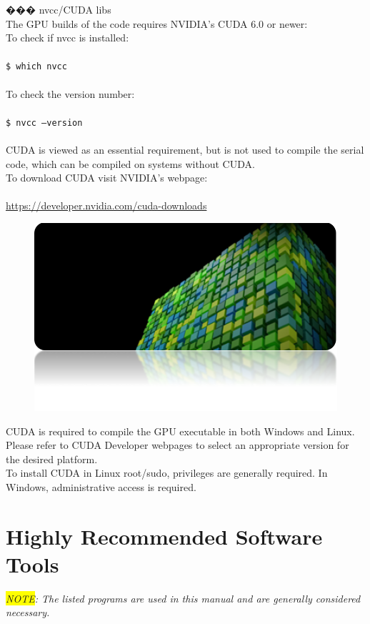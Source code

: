 \begin{easylist}[articletoc]
��� nvcc/CUDA libs\\
The GPU builds of the code requires NVIDIA's CUDA 6.0 or newer:\\
To check if nvcc is installed:\\\\
\texttt{\$ which nvcc}\\\\
To check the version number:\\\\
\texttt{\$ nvcc --version}\\\\
CUDA is viewed as an essential requirement, but is not used to compile the serial code, which can be compiled on systems without CUDA.\\
To download CUDA visit NVIDIA's webpage:\\\\
\url{https://developer.nvidia.com/cuda-downloads}
\begin{figure}[H]
\centering
\includegraphics[scale=0.6]{images/cuda}
\end{figure}
CUDA is required to compile the GPU executable in both Windows and Linux.  Please refer to CUDA Developer webpages to select an appropriate version for the desired platform.\\
To install CUDA in Linux root/sudo, privileges are generally required.  In Windows, administrative access is required.
\end{easylist}

\section{Highly Recommended Software Tools}
\textit{\colorbox{yellow}{NOTE}: The listed programs are used in this manual and are generally considered necessary.}
